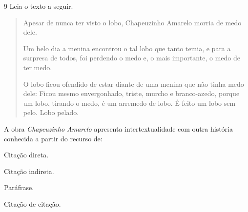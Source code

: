 \num{9} Leia o texto a seguir.

\begin{quote}
\noindent Apesar de nunca ter visto o lobo, Chapeuzinho Amarelo morria de medo
dele.

Um belo dia a menina encontrou o tal lobo que tanto temia, e para a
surpresa de todos, foi perdendo o medo e, o mais importante, o medo de
ter medo.

O lobo ficou ofendido de estar diante de uma menina que não tinha medo
dele: Ficou mesmo envergonhado, triste, murcho e branco-azedo, porque um
lobo, tirando o medo, é um arremedo de lobo. É feito um lobo sem pelo.
Lobo pelado.

\end{quote}

\noindent A obra \emph{Chapeuzinho Amarelo} apresenta intertextualidade com outra
história conhecida a partir do recurso de:

\begin{escolha}
\item Citação direta.
\item Citação indireta.
\item Paráfrase.
\item Citação de citação.
\end{escolha}




